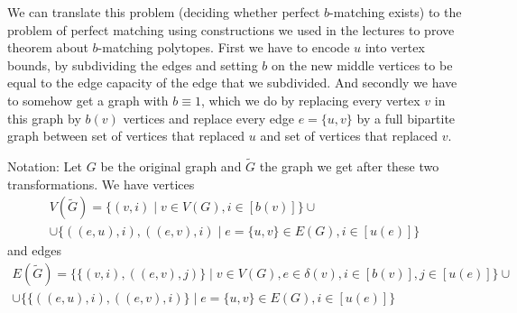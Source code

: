 \begin{exercise}{3}
    
    We can translate this problem (deciding whether perfect $b$-matching exists)
    to the problem of perfect matching using constructions we used in the
    lectures to prove theorem about $b$-matching polytopes. First we have to
    encode $u$ into vertex bounds, by subdividing the edges and setting $b$ on
    the new middle vertices to be equal to the edge capacity of the edge that we
    subdivided. And secondly we have to somehow get a graph with $b \equiv 1$,
    which we do by replacing every vertex $v$ in this graph by $b(v)$ vertices
    and replace every edge $e = \{u, v\}$ by a full bipartite graph between set
    of vertices that replaced $u$ and set of vertices that replaced $v$.

    Notation:
    Let $G$ be the original graph and $\tilde{G}$ the graph we get after these
    two transformations. We have vertices
    \begin{multline*}
        V(\tilde{G}) = \{ (v, i) \mid v \in V(G), i \in [b(v)] \} \cup \\
        \cup \{ ((e, u), i), ((e, v), i) \mid e = \{u, v\} \in E(G), i \in [u(e)] \}
    \end{multline*}
    and edges 
    \begin{multline*}
        E(\tilde{G}) = \{ \{ (v, i), ((e, v), j) \} \mid v \in V(G), e \in
        \delta(v), i \in [b(v)], j \in [u(e)] \} \cup \\
        \cup \{ \{ ((e, u), i), ((e, v), i) \} \mid e = \{u, v\} \in E(G), i \in [u(e)] \}
    \end{multline*}



\end{exercise}

